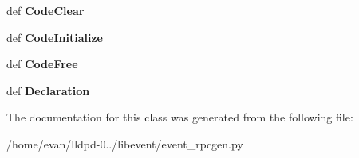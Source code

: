 \begin{DoxyCompactItemize}
\item 
def {\bfseries \-Code\-Clear}\label{classevent__rpcgen_1_1_entry_string_a7b18b6858614ca342000830c02218696}

\item 
def {\bfseries \-Code\-Initialize}\label{classevent__rpcgen_1_1_entry_string_a24ae658809888439abef27b3633d22a0}

\item 
def {\bfseries \-Code\-Free}\label{classevent__rpcgen_1_1_entry_string_a81ad9b6c3af1d0fe115d2b2e54ee8a17}

\item 
def {\bfseries \-Declaration}\label{classevent__rpcgen_1_1_entry_string_a564a165c99a4874ce9135fc27e62cebc}

\end{DoxyCompactItemize}


\-The documentation for this class was generated from the following file\-:\begin{DoxyCompactItemize}
\item 
/home/evan/lldpd-\/0../libevent/event\-\_\-rpcgen.\-py\end{DoxyCompactItemize}
